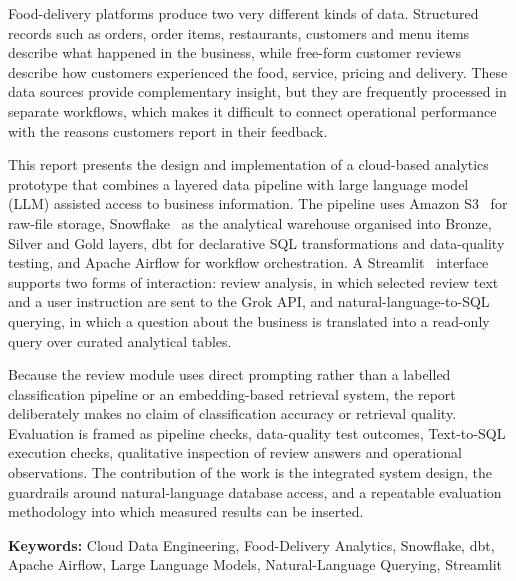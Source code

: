 \documentclass[12pt,a4paper]{report}
\begin{document}
\noindent Food-delivery platforms produce two very different kinds of data. Structured records such as orders, order items, restaurants, customers and menu items describe what happened in the business, while free-form customer reviews describe how customers experienced the food, service, pricing and delivery. These data sources provide complementary insight, but they are frequently processed in separate workflows, which makes it difficult to connect operational performance with the reasons customers report in their feedback.

This report presents the design and implementation of a cloud-based analytics prototype that combines a layered data pipeline with large language model (LLM) assisted access to business information. The pipeline uses Amazon S3~\cite{ref20} for raw-file storage, Snowflake~\cite{ref21} as the analytical warehouse organised into Bronze, Silver and Gold layers, dbt for declarative SQL transformations and data-quality testing, and Apache Airflow for workflow orchestration. A Streamlit~\cite{ref22} interface supports two forms of interaction: review analysis, in which selected review text and a user instruction are sent to the Grok API, and natural-language-to-SQL querying, in which a question about the business is translated into a read-only query over curated analytical tables.

Because the review module uses direct prompting rather than a labelled classification pipeline or an embedding-based retrieval system, the report deliberately makes no claim of classification accuracy or retrieval quality. Evaluation is framed as pipeline checks, data-quality test outcomes, Text-to-SQL execution checks, qualitative inspection of review answers and operational observations. The contribution of the work is the integrated system design, the guardrails around natural-language database access, and a repeatable evaluation methodology into which measured results can be inserted.

\vspace{0.4cm}
\noindent\textbf{Keywords:} Cloud Data Engineering, Food-Delivery Analytics, Snowflake, dbt, Apache Airflow, Large Language Models, Natural-Language Querying, Streamlit

\clearpage
\tableofcontents

\clearpage
{}
\listoffigures
\end{document}
